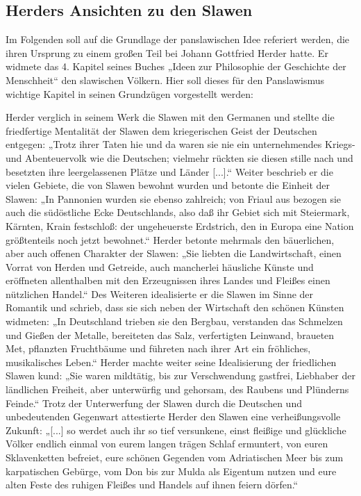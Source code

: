 \documentclass[12pt,headsepline,a4paper]{scrartcl}
\begin{document}
\subsection{Herders Ansichten zu den Slawen}
Im Folgenden soll auf die Grundlage der panslawischen Idee referiert werden, die ihren
Ursprung zu einem großen Teil bei Johann Gottfried Herder hatte. Er widmete das 4. Kapitel
seines Buches „Ideen zur Philosophie der Geschichte der Menschheit“ den slawischen Völkern.
Hier soll dieses für den Panslawismus wichtige Kapitel in seinen Grundzügen vorgestellt
werden:

Herder verglich in seinem Werk die Slawen mit den Germanen und stellte die friedfertige
Mentalität der Slawen dem kriegerischen Geist der Deutschen entgegen: „Trotz ihrer Taten
hie und da waren sie nie ein unternehmendes Kriegs- und Abenteuervolk wie die Deutschen;
vielmehr rückten sie diesen stille nach und besetzten ihre leergelassenen Plätze und Länder
[...].“\autocite[279]{herder} Weiter beschrieb er die vielen Gebiete, die von Slawen bewohnt
wurden und betonte die Einheit der Slawen: „In Pannonien wurden sie ebenso zahlreich; von
Friaul aus bezogen sie auch die südöstliche Ecke Deutschlands, also daß ihr Gebiet sich mit
Steiermark, Kärnten, Krain festschloß: der ungeheuerste Erdstrich, den in Europa eine Nation
größtenteils noch jetzt bewohnet.“\autocite[279]{herder} Herder betonte mehrmals den bäuerlichen, aber
auch offenen Charakter der Slawen: „Sie liebten die Landwirtschaft, einen Vorrat von Herden
und Getreide, auch mancherlei häusliche Künste und eröffneten allenthalben mit den
Erzeugnissen ihres Landes und Fleißes einen nützlichen Handel.“\autocite[280]{herder} Des Weiteren
idealisierte er die Slawen im Sinne der Romantik und schrieb, dass sie sich neben der
Wirtschaft den schönen Künsten widmeten: „In Deutschland trieben sie den Bergbau,
verstanden das Schmelzen und Gießen der Metalle, bereiteten das Salz, verfertigten
Leinwand, braueten Met, pflanzten Fruchtbäume und führeten nach ihrer Art ein fröhliches,
musikalisches Leben.“\autocite[280]{herder} Herder machte weiter seine Idealisierung der friedlichen
Slawen kund: „Sie waren mildtätig, bis zur Verschwendung gastfrei, Liebhaber der ländlichen
Freiheit, aber unterwürfig und gehorsam, des Raubens und Plünderns Feinde.“\autocite[280]{herder}
Trotz der Unterwerfung der Slawen durch die Deutschen und unbedeutenden Gegenwart
attestierte Herder den Slawen eine verheißungsvolle Zukunft: „[...] so werdet auch ihr so tief
versunkene, einst fleißige und glückliche Völker endlich einmal von eurem langen trägen
Schlaf ermuntert, von euren Sklavenketten befreiet, eure schönen Gegenden vom Adriatischen
Meer bis zum karpatischen Gebürge, vom Don bis zur Mulda als Eigentum nutzen und eure
alten Feste des ruhigen Fleißes und Handels auf ihnen feiern dörfen.“\autocite[281]{herder}
\end{document}
